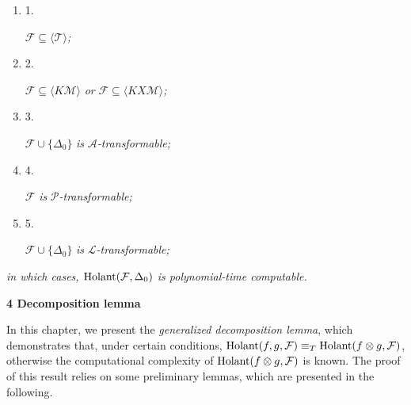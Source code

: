 \documentclass[10pt,a4paper]{article}
\begin{document}
\begin{enumerate}


\item[] 
1. 


$\mathcal{F}\subseteq\langle\mathcal{T}\rangle$\emph{;}\par





\item[] 
2. 


$\mathcal{F}\subseteq\langle K\mathcal{M}\rangle$\emph{ or }$\mathcal{F}\subseteq\langle KX\mathcal{M}\rangle$\emph{;}\par





\item[] 
3. 


$\mathcal{F}\cup\{\Delta_{0}\}$\emph{ is }$\mathscr{A}$\emph{-transformable;}\par





\item[] 
4. 


$\mathcal{F}$\emph{ is }$\mathscr{P}$\emph{-transformable;}\par





\item[] 
5. 


$\mathcal{F}\cup\{\Delta_{0}\}$\emph{ is }$\mathscr{L}$\emph{-transformable;}\par





\end{enumerate}


\emph{in which cases, $\textup{{Holant}}(\mathcal{F},\Delta_{0})$ is polynomial-time computable.}\par







\par\medskip\noindent\textbf{
4 Decomposition lemma}\par




In this chapter, we present the \emph{generalized decomposition lemma}, which demonstrates that, under certain conditions, $\textup{{Holant}}(f,g,\mathcal{F})\equiv_{T}\textup{{Holant}}(f\otimes g,\mathcal{F})$, otherwise the computational complexity of $\textup{{Holant}}(f\otimes g,\mathcal{F})$ is known. The proof of this result relies on some preliminary lemmas, which are presented in the following.\par
\end{document}
